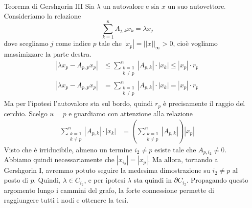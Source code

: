 \documentclass[a4paper]{article}
\begin{document}
\begin{snippetproof}{Teorema di Gershgorin III}
    Sia \(\lambda\) un autovalore e sia \(x\) un suo autovettore.
    Consideriamo la relazione
    \[
        \sum_{k=1}^n A_{j,k} x_k = \lambda x_j
    \]
    dove scegliamo \(j\) come indice \(p\) tale che \(|x_p| = ||x||_\infty > 0\),
    cioè vogliamo massimizzare la parte destra.
    \begin{align*}
        |\lambda x_p - A_{p,p} x_p| &\leq
        \sum_{\substack{k=1 \\ k \neq p}}^n |A_{p,k}| \cdot |x_k| \leq |x_p| \cdot r_p \\
        |\lambda x_p - A_{p,p} x_p| &=
        \sum_{\substack{k=1 \\ k \neq p}}^n |A_{p,k}| \cdot |x_k| = |x_p| \cdot r_p
    \end{align*}
    Ma per l'ipotesi l'autovalore sta sul bordo, quindi \(r_p\) è precisamente il raggio
    del cerchio.
    Scelgo \(u = p\) e guardiamo con attenzione alla relazione
    \begin{align*}
        \sum_{\substack{k=1 \\ k \neq p}}^n
        |A_{p,k}| \cdot |x_k| &= \left(
            \sum_{\substack{k=1 \\ k \neq p}}^n |A_{p,k}|
        \right) |x_p|
    \end{align*}
    Visto che è irriducibile, almeno un termine \(i_2 \neq p\)
    esiste tale che \(A_{p,i_2} \neq 0\).
    Abbiamo quindi necessariamente che \(|x_{i_2}| = |x_p|\).
    Ma allora, tornando a Gershgorin I, avremmo potuto seguire la medesima dimostrazione
    su \(i_2 \neq p\) al posto di \(p\).
    Quindi, \(\lambda \in C_{i_2}\), e per ipotesi
    \(\lambda\) sta quindi in \(\partial C_{i_2}\).
    Propagando questo argomento lungo i cammini del grafo, la forte connessione permette di raggiungere tutti i nodi e ottenere la tesi.
\end{snippetproof}
\end{document}
